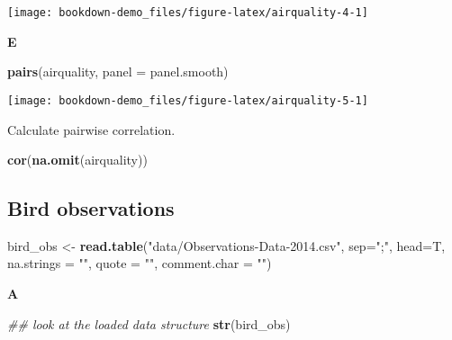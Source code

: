 \documentclass[]{book}
\newenvironment{Shaded}{\begin{snugshade}}{\end{snugshade}}
\newcommand{\CommentTok}[1]{\textcolor[rgb]{0.56,0.35,0.01}{\textit{#1}}}
\newcommand{\DataTypeTok}[1]{\textcolor[rgb]{0.13,0.29,0.53}{#1}}
\newcommand{\KeywordTok}[1]{\textcolor[rgb]{0.13,0.29,0.53}{\textbf{#1}}}
\newcommand{\NormalTok}[1]{#1}
\newcommand{\StringTok}[1]{\textcolor[rgb]{0.31,0.60,0.02}{#1}}
\begin{document}
\begin{center}\texttt{[image: bookdown-demo\_files/figure-latex/airquality-4-1]} \end{center}

\textbf{E}

\begin{Shaded}
\begin{Highlighting}[]
\KeywordTok{pairs}\NormalTok{(airquality, }\DataTypeTok{panel =}\NormalTok{ panel.smooth)}
\end{Highlighting}
\end{Shaded}

\begin{center}\texttt{[image: bookdown-demo\_files/figure-latex/airquality-5-1]} \end{center}

Calculate pairwise correlation.

\begin{Shaded}
\begin{Highlighting}[]
\KeywordTok{cor}\NormalTok{(}\KeywordTok{na.omit}\NormalTok{(airquality))}
\end{Highlighting}
\end{Shaded}

\hypertarget{bird-observations-1}{%
\subsection{Bird observations}\label{bird-observations-1}}

\begin{Shaded}
\begin{Highlighting}[]
\NormalTok{bird_obs <-}\StringTok{ }\KeywordTok{read.table}\NormalTok{(}\StringTok{"data/Observations-Data-2014.csv"}\NormalTok{, }
                                             \DataTypeTok{sep=}\StringTok{";"}\NormalTok{, }
                                             \DataTypeTok{head=}\NormalTok{T, }
                                             \DataTypeTok{na.strings =} \StringTok{""}\NormalTok{, }
                                             \DataTypeTok{quote =} \StringTok{""}\NormalTok{, }
                                             \DataTypeTok{comment.char =} \StringTok{""}\NormalTok{)}
\end{Highlighting}
\end{Shaded}

\textbf{A}

\begin{Shaded}
\begin{Highlighting}[]
\CommentTok{## look at the loaded data structure}
\KeywordTok{str}\NormalTok{(bird_obs)}
\end{Highlighting}
\end{Shaded}
\end{document}
